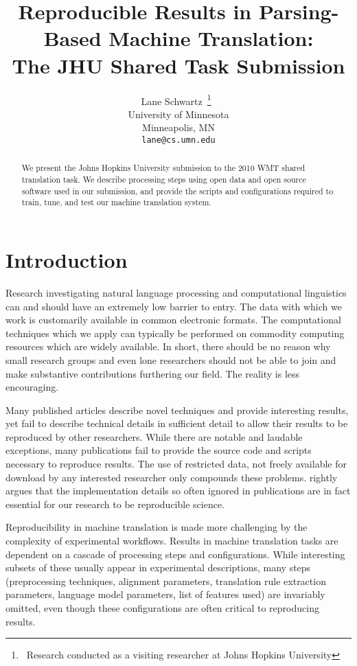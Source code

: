 \documentclass[11pt]{article}
\title{Reproducible Results in Parsing-Based Machine Translation:\\
The JHU Shared Task Submission}
\author{Lane Schwartz\
\thanks{\ Research conducted as a visiting researcher at Johns Hopkins University}\
\\University of Minnesota\\Minneapolis, MN\\
{\tt lane@cs.umn.edu}%
}
\date{}
\begin{document}
\maketitle

\begin{abstract}
We present the Johns Hopkins University submission to the 2010 WMT shared translation task. We describe processing steps using open data and open source software used in our submission, and provide the scripts and configurations required to train, tune, and test our machine translation system.
\end{abstract}


\section{Introduction}

Research investigating natural language processing and computational linguistics can and should have an extremely low barrier to entry. The data with which we work is customarily available in common electronic formats. The computational techniques which we apply can typically be performed on commodity computing resources which are widely available. In short, there should be no reason why small research groups and even lone researchers should not be able to join and make substantive contributions furthering our field.
%
The reality is less encouraging. 

Many published articles describe novel techniques and provide interesting results, yet fail to describe technical details in sufficient detail to allow their results to be reproduced by other researchers. While there are notable and laudable exceptions, many publications fail to provide the source code and scripts necessary to reproduce results. The use of restricted data, not freely available for download by any interested researcher only compounds these problems.  rightly argues that the implementation details so often ignored in publications are in fact essential for our research to be reproducible science.

Reproducibility in machine translation is made more challenging by the complexity of experimental workflows. Results in machine translation tasks are dependent on a cascade of processing steps and configurations. While interesting subsets of these usually appear in experimental descriptions, many steps (preprocessing techniques, alignment parameters, translation rule extraction parameters, language model parameters, list of features used) are invariably omitted, even though these configurations are often critical to reproducing results.
\end{document}
